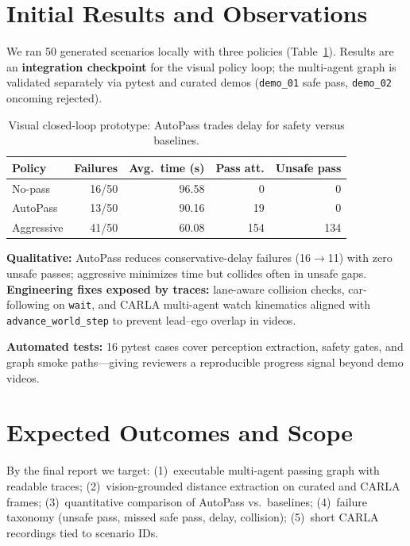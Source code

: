 \documentclass[10pt,twocolumn,letterpaper]{article}
\begin{document}
\section{Initial Results and Observations}
We ran 50 generated scenarios locally with three policies (Table~\ref{tab:results}).
Results are an \textbf{integration checkpoint} for the visual policy loop; the multi-agent graph is validated separately via pytest and curated demos (\texttt{demo\_01} safe pass, \texttt{demo\_02} oncoming rejected).

\begin{table}[t]
\centering
\small
\begin{tabular}{lrrrr}
\toprule
Policy & Failures & Avg.\ time (s) & Pass att. & Unsafe pass \\
\midrule
No-pass & 16/50 & 96.58 & 0 & 0 \\
AutoPass & 13/50 & 90.16 & 19 & 0 \\
Aggressive & 41/50 & 60.08 & 154 & 134 \\
\bottomrule
\end{tabular}
\caption{Visual closed-loop prototype: AutoPass trades delay for safety versus baselines.}
\label{tab:results}
\vspace{-6pt}
\end{table}

\textbf{Qualitative:} AutoPass reduces conservative-delay failures (16$\rightarrow$11) with zero unsafe passes; aggressive minimizes time but collides often in unsafe gaps.
\textbf{Engineering fixes exposed by traces:} lane-aware collision checks, car-following on \texttt{wait}, and CARLA multi-agent watch kinematics aligned with \texttt{advance\_world\_step} to prevent lead--ego overlap in videos.

\textbf{Automated tests:} 16 pytest cases cover perception extraction, safety gates, and graph smoke paths---giving reviewers a reproducible progress signal beyond demo videos.

\section{Expected Outcomes and Scope}
By the final report we target: (1)~executable multi-agent passing graph with readable traces; (2)~vision-grounded distance extraction on curated and CARLA frames; (3)~quantitative comparison of AutoPass vs.\ baselines; (4)~failure taxonomy (unsafe pass, missed safe pass, delay, collision); (5)~short CARLA recordings tied to scenario IDs.
\end{document}
